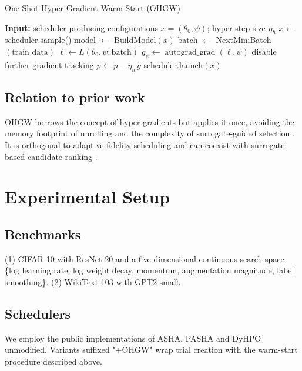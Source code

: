 \documentclass{article}
\begin{document}
\begin{algorithm}[H]
\caption{One-Shot Hyper-Gradient Warm-Start (OHGW)}
\begin{algorithmic}[1]
\State \textbf{Input:} scheduler producing configurations \(x=(\theta_0,\psi)\); hyper-step size \(\eta_h\)
  \State \(x \leftarrow\) scheduler.sample()
  \State model \(\leftarrow\) BuildModel\((x)\)
  \State batch \(\leftarrow\) NextMiniBatch\((\text{train data})\)
  \State \(\ell \leftarrow L(\theta_0, \psi; \text{batch})\)
  \State \(g_{\psi} \leftarrow \operatorname{autograd\_grad}(\ell, \psi)\)
  \State disable further gradient tracking
    \State \(p \leftarrow p - \eta_h\, g\)
  \EndFor
  \State scheduler.launch\((x)\) 
\EndWhile
\end{algorithmic}
\end{algorithm}

\subsection{Relation to prior work}
OHGW borrows the concept of hyper-gradients but applies it once, avoiding the memory footprint of unrolling \cite{bertrand-2020-implicit} and the complexity of surrogate-guided selection \cite{nguyen-2019-bayesian}. It is orthogonal to adaptive-fidelity scheduling \cite{jiang-2024-efficient} and can coexist with surrogate-based candidate ranking \cite{khazi-2023-deep}.

\section{Experimental Setup}
\subsection{Benchmarks}
(1) CIFAR-10 with ResNet-20 and a five-dimensional continuous search space \{log learning rate, log weight decay, momentum, augmentation magnitude, label smoothing\}. (2) WikiText-103 with GPT2-small.

\subsection{Schedulers}
We employ the public implementations of ASHA, PASHA and DyHPO \cite{bohdal-2022-pasha,wistuba-2022-supervising} unmodified. Variants suffixed "+OHGW" wrap trial creation with the warm-start procedure described above.
\end{document}
